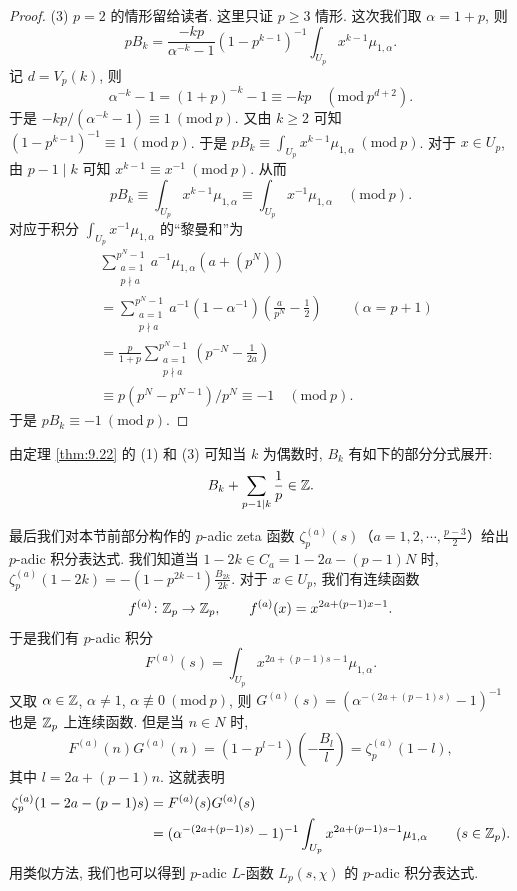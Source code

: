 \begin{proof}
(3) $p=2$ 的情形留给读者. 这里只证 $p\geqslant 3$ 情形. 这次我们取 $\alpha=1+p$, 则
\[
  pB_k=\frac{-kp}{\alpha^{-k}-1}(1-p^{k-1})^{-1}\int_{U_p}x^{k-1}\mu_{1,\alpha}.
\]
记 $d=V_p(k)$, 则
\[
  \alpha^{-k}-1=(1+p)^{-k}-1\equiv -kp\quad(\mathrm{mod}\ p^{d+2}).
\]
于是 $-kp/(\alpha^{-k}-1)\equiv 1\ (\mathrm{mod}\ p)$. 又由 $k\geqslant 2$ 可知 $(1-p^{k-1})^{-1}\equiv 1\ (\mathrm{mod}\ p)$. 于是 $pB_k\equiv\int_{U_p}x^{k-1}\mu_{1,\alpha}\ (\mathrm{mod}\ p)$. 对于 $x\in U_p$, 由 $p-1\mid k$ 可知 $x^{k-1}\equiv x^{-1}\ (\mathrm{mod}\ p)$. 从而
\[
  pB_k\equiv\int_{U_p}x^{k-1}\mu_{1,\alpha}
  \equiv\int_{U_p}x^{-1}\mu_{1,\alpha}\quad(\mathrm{mod}\ p).
\]
对应于积分 $\int_{U_p}x^{-1}\mu_{1,\alpha}$ 的``黎曼和''为
\[
  \begin{aligned}
    &\sum_{\substack{a=1\\ p\nmid a}}^{p^N-1}a^{-1}\mu_{1,\alpha}(a+(p^N))\\
    &=\sum_{\substack{a=1\\ p\nmid a}}^{p^N-1}a^{-1}(1-\alpha^{-1})\left(\frac{a}{p^N}-\frac{1}{2}\right)
    \qquad(\alpha=p+1)\\
    &=\frac{p}{1+p}\sum_{\substack{a=1\\ p\nmid a}}^{p^N-1}\left(p^{-N}-\frac{1}{2a}\right)\\
    &\equiv p(p^N-p^{N-1})/p^N\equiv -1\quad(\mathrm{mod}\ p).
  \end{aligned}
\]
于是 $pB_k\equiv -1\ (\mathrm{mod}\ p)$.
\end{proof}

\begin{remark}
由定理 \ref{thm:9.22} 的 (1) 和 (3) 可知当 $k$ 为偶数时, $B_k$ 有如下的部分分式展开:
\[
  B_k+\sum_{p-1\mid k}\frac{1}{p}\in\mathbb{Z}.
\]
\end{remark}

最后我们对本节前部分构作的 $p$-adic zeta 函数 $\zeta_p^{(a)}(s)$（$a=1,2,\cdots,\frac{p-3}{2}$）给出 $p$-adic 积分表达式. 我们知道当 $1-2k\in C_a=1-2a-(p-1)N$ 时, $\zeta_p^{(a)}(1-2k)=-(1-p^{2k-1})\frac{B_{2k}}{2k}$. 对于 $x\in U_p$, 我们有连续函数
\[
  f^{(a)}\colon\mathbb{Z}_p\to\mathbb{Z}_p,\qquad f^{(a)}(x)=x^{2a+(p-1)x-1}.
\]
于是我们有 $p$-adic 积分
\[
  F^{(a)}(s)=\int_{U_p}x^{2a+(p-1)s-1}\mu_{1,\alpha}.
\]
又取 $\alpha\in\mathbb{Z}$, $\alpha\neq 1$, $\alpha\not\equiv 0\ (\mathrm{mod}\ p)$, 则 $G^{(a)}(s)=(\alpha^{-(2a+(p-1)s)}-1)^{-1}$ 也是 $\mathbb{Z}_p$ 上连续函数. 但是当 $n\in N$ 时,
\[
  F^{(a)}(n)G^{(a)}(n)=(1-p^{l-1})\left(-\frac{B_l}{l}\right)
  =\zeta_p^{(a)}(1-l),
\]
其中 $l=2a+(p-1)n$. 这就表明
\[
  \begin{aligned}
    \zeta_p^{(a)}(1-2a-(p-1)s)&=F^{(a)}(s)G^{(a)}(s)\\
    &=(\alpha^{-(2a+(p-1)s)}-1)^{-1}\int_{U_p}x^{2a+(p-1)s-1}\mu_{1,\alpha}
    \qquad(s\in\mathbb{Z}_p).
  \end{aligned}
\]
用类似方法, 我们也可以得到 $p$-adic $L$-函数 $L_p(s,\chi)$ 的 $p$-adic 积分表达式.

